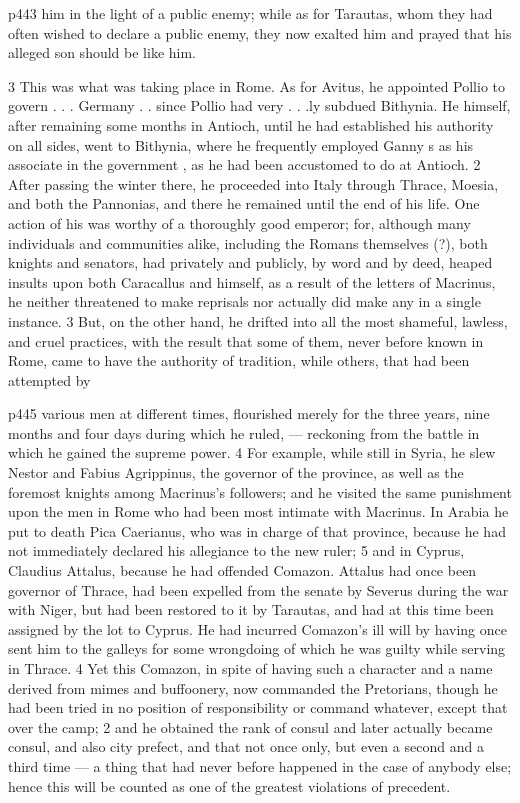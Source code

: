 p443 him in the light of a public enemy; while as for Tarautas, whom they had often wished to declare a public enemy, they now exalted him and prayed that his alleged son should be like him.

3
This was what was taking place in Rome. As for Avitus, he appointed Pollio to govern . . . Germany . . since Pollio had very . . .ly subdued Bithynia. He himself, after remaining some months in Antioch, until he had established his authority on all sides, went to Bithynia, where he frequently employed Ganny s as his associate in the government , as he had been accustomed to do at Antioch. 2 After passing the winter there, he proceeded into Italy through Thrace, Moesia, and both the Pannonias, and there he remained until the end of his life. One action of his was worthy of a thoroughly good emperor; for, although many individuals and communities alike, including the Romans themselves (?), both knights and senators, had privately and publicly, by word and by deed, heaped insults upon both Caracallus and himself, as a result of the letters of Macrinus, he neither threatened to make reprisals nor actually did make any in a single instance. 3 But, on the other hand, he drifted into all the most shameful, lawless, and cruel practices, with the result that some of them, never before known in Rome, came to have the authority of tradition, while others, that had been attempted by

p445 various men at different times, flourished merely for the three years, nine months and four days during which he ruled, \texthebrew{—} reckoning from the battle in which he gained the supreme power. 4 For example, while still in Syria, he slew Nestor and Fabius Agrippinus, the governor of the province, as well as the foremost knights among Macrinus's followers; and he visited the same punishment upon the men in Rome who had been most intimate with Macrinus. In Arabia he put to death Pica Caerianus, who was in charge of that province, because he had not immediately declared his allegiance to the new ruler; 5 and in Cyprus, Claudius Attalus, because he had offended Comazon. Attalus had once been governor of Thrace, had been expelled from the senate by Severus during the war with Niger, but had been restored to it by Tarautas, and had at this time been assigned by the lot to Cyprus. He had incurred Comazon's ill will by having once sent him to the galleys for some wrongdoing of which he was guilty while serving in Thrace. 4
Yet this Comazon, in spite of having such a character and a name derived from mimes and buffoonery, now commanded the Pretorians, though he had been tried in no position of responsibility or command whatever, except that over the camp; 2 and he obtained the rank of consul and later actually became consul, and also city prefect, and that not once only, but even a second and a third time \texthebrew{—} a thing that had never before happened in the case of anybody else; hence this will be counted as one of the greatest violations of precedent.

